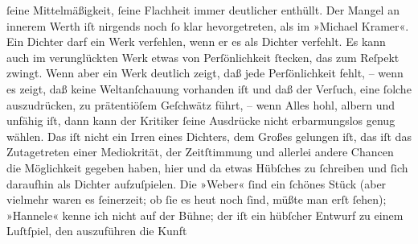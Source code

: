 \begin{ledgroupsized}[t]{13cm}
               ſeine Mittelmäßigkeit, ſeine Flachheit immer deutlicher enthüllt. Der Mangel an
               innerem Werth iſt nirgends noch ſo klar hevorgetreten, als im »Michael Kramer«. Ein Dichter darf ein Werk verfehlen, wenn er
               es als Dichter verfehlt. Es kann auch im verunglückten Werk  etwas von Perſönlichkeit ſtecken, das zum Reſpekt zwingt. {\pb}Wenn aber ein Werk deutlich zeigt, daß jede
               Perſönlichkeit fehlt, – wenn es zeigt, daß keine Weltanſchauung vorhanden iſt und daß
               der Verſuch, eine ſolche auszudrücken, zu  prätentiöſem Geſchwätz führt, – wenn Alles hohl, albern und unfähig iſt, dann
               kann der Kritiker ſeine Ausdrücke nicht erbarmungslos genug  wählen. Das iſt nicht ein Irren eines Dichters, dem Großes gelungen
               iſt, das iſt das Zutagetreten einer Mediokrität, der Zeitſtimmung und allerlei andere
               Chancen die Möglichkeit gegeben haben, hier und da etwas Hübſches zu ſchreiben und
               ſich daraufhin als Dichter aufzuſpielen. Die »Weber« {\pb}ſind ein ſchönes Stück (aber vielmehr  waren es ſeinerzeit;  ob ſie es heut noch ſind, müßte man erſt  ſehen); »Hannele«  kenne ich nicht auf der Bühne; der \label{K_L02947-4v}\label{K_L02947-4h} iſt ein hübſcher Entwurf zu einem Luſtſpiel, den auszuführen die Kunft

\end{ledgroupsized}
